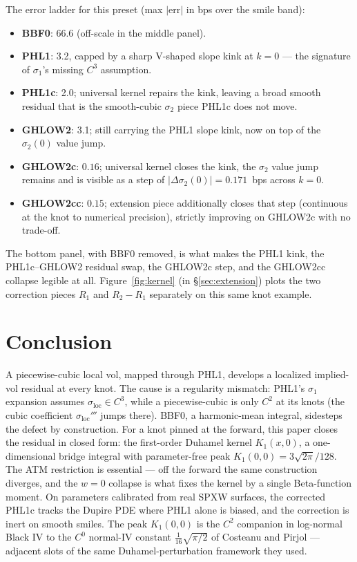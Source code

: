 \documentclass[11pt]{article}
\newcommand{\sloc}{\sigma_{\mathrm{loc}}}
\begin{document}
The error ladder for this preset (max $|\mathrm{err}|$ in bps over the
smile band):
\begin{itemize}
\item \textbf{BBF0}: 66.6 (off-scale in the middle panel).
\item \textbf{PHL1}: 3.2, capped by a sharp V-shaped slope kink at
$k=0$ --- the signature of $\sigma_1$'s missing $C^3$ assumption.
\item \textbf{PHL1c}: 2.0; universal kernel repairs the kink, leaving
a broad smooth residual that is the smooth-cubic $\sigma_2$ piece
PHL1c does not move.
\item \textbf{GHLOW2}: 3.1; still carrying the PHL1 slope kink, now on
top of the $\sigma_2(0)$ value jump.
\item \textbf{GHLOW2c}: $0.16$; universal kernel closes the kink, the
$\sigma_2$ value jump remains and is visible as a step of
$|\Delta\sigma_2(0)| = 0.171$~bps across $k=0$.
\item \textbf{GHLOW2cc}: $0.15$; extension piece additionally closes
that step (continuous at the knot to numerical precision), strictly
improving on GHLOW2c with no trade-off.
\end{itemize}

The bottom panel, with BBF0 removed, is what makes the PHL1 kink, the
PHL1c--GHLOW2 residual swap, the GHLOW2c step, and the GHLOW2cc
collapse legible at all. Figure~\ref{fig:kernel} (in
\S\ref{sec:extension}) plots the two correction pieces $R_{1}$
and $R_{2} - R_{1}$ separately on this same knot example.

\section{Conclusion}

A piecewise-cubic local vol, mapped through PHL1, develops a
localized implied-vol residual at every knot. The cause is a
regularity mismatch: PHL1's $\sigma_1$ expansion assumes $\sloc \in
C^3$, while a piecewise-cubic is only $C^2$ at its knots (the cubic
coefficient $\sloc'''$ jumps there). BBF0, a harmonic-mean integral,
sidesteps the defect by construction. For a knot pinned at the
forward, this paper closes the residual in closed form: the
first-order Duhamel kernel $K_1(x,0)$, a one-dimensional bridge
integral with parameter-free peak $K_1(0,0) = 3\sqrt{2\pi}/128$. The
ATM restriction is essential --- off the forward the same construction
diverges, and the $w=0$ collapse is what fixes the kernel by a single
Beta-function moment. On parameters calibrated from real SPXW
surfaces, the corrected PHL1c tracks the Dupire PDE where PHL1 alone
is biased, and the correction is inert on smooth smiles. The peak
$K_1(0,0)$ is the $C^{2}$ companion in log-normal Black IV to the
$C^{0}$ normal-IV constant $\tfrac{1}{16}\sqrt{\pi/2}$ of Costeanu
and Pirjol --- adjacent slots of the same Duhamel-perturbation
framework they used.
\end{document}

